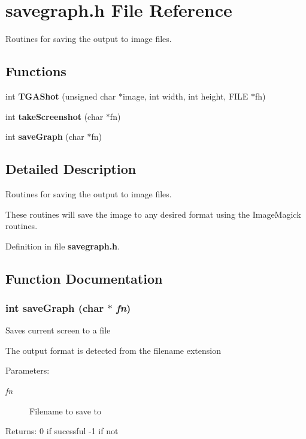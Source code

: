 \section{savegraph.h File Reference}
\label{savegraph_8h}
Routines for saving the output to image files.  


\subsection*{Functions}
\begin{CompactItemize}
\item 
int {\bf TGAShot} (unsigned char $\ast$image, int width, int height, FILE $\ast$fh)
\item 
int {\bf take\-Screenshot} (char $\ast$fn)
\item 
int {\bf save\-Graph} (char $\ast$fn)
\end{CompactItemize}


\subsection{Detailed Description}
Routines for saving the output to image files. 

These routines will save the image to any desired format using the Image\-Magick routines.

Definition in file {\bf savegraph.h}.

\subsection{Function Documentation}
\subsubsection{\setlength{\rightskip}{0pt plus 5cm}int save\-Graph (char $\ast$ {\em fn})}\label{savegraph_8h_a2}


Saves current screen to a file

The output format is detected from the filename extension \begin{Desc}
\item[Parameters:]
\begin{description}
\item[{\em fn}]Filename to save to \end{description}
\end{Desc}
\begin{Desc}
\item[Returns:]0 if sucessful -1 if not \end{Desc}


